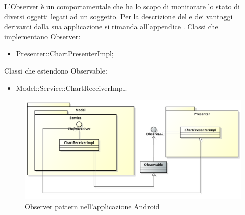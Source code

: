                 
            L'Observer è un  comportamentale che ha lo scopo di monitorare lo stato di diversi oggetti legati ad un soggetto. Per la descrizione del  e dei vantaggi derivanti dalla sua applicazione si rimanda all'appendice .
                Classi che implementano Observer:
                \begin{itemize}
                    \item Presenter::ChartPresenterImpl;
                \end{itemize}
                Classi che estendono Observable:
                \begin{itemize}
                    \item Model::Service::ChartReceiverImpl.
                \end{itemize}
                \begin{figure}[H]\centering
	        		\includegraphics[width=\textwidth]{SpecificaTecnica/Pics/DesignPatternApp/Observer}
	        		\caption{Observer pattern nell'applicazione Android}
	    		\end{figure}
                
